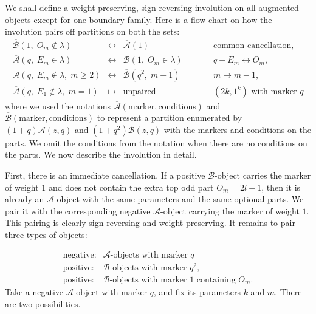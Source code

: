 \documentclass[reqno]{amsart}
\theoremstyle{definition}
\theoremstyle{plain}
\theoremstyle{remark}
\numberwithin{equation}{section}
\begin{document}
We shall define a weight-preserving, sign-reversing involution on all augmented
objects except for one boundary family. Here is a flow-chart on how the involution pairs off partitions on both the sets:
\[
\begin{array}{rclcl}
\overline{\mathcal B}(1,\;O_m\notin\lambda)
&\longleftrightarrow&
\overline{\mathcal A}(1)
&\qquad&
\text{common cancellation},\\[2mm]

\overline{\mathcal A}(q,\;E_m\in\lambda)
&\longleftrightarrow&
\overline{\mathcal B}(1,\;O_m\in\lambda)
&\qquad&
q+E_m\leftrightarrow O_m,\\[2mm]

\overline{\mathcal A}(q,\;E_m\notin\lambda,\;m\ge2)
&\longleftrightarrow&
\overline{\mathcal B}(q^2,\;m-1)
&\qquad&
m\mapsto m-1,\\[2mm]

\overline{\mathcal A}(q,\;E_1\notin\lambda,\;m=1)
&\longmapsto&
\text{unpaired}
&\qquad&
(2k,1^k)\text{ with marker }q
\end{array}
\]
where we used the notations $\overline{\mathcal A}(\text{marker},\text{conditions})$ and $\overline{\mathcal B}(\text{marker},\text{conditions})$ to represent a partition enumerated by $(1+q)\mathcal A(z,q)$ and $(1+q^2)\mathcal B(z,q)$ with the markers and conditions on the parts. We omit the conditions from the notation when there are no conditions on the parts. We now describe the involution in detail. 

First, there is an immediate cancellation.  If a positive \(\mathcal B\)-object carries the marker of weight \(1\) and does not contain the extra top odd part \(O_m=2l-1\), then it is already
an \(\mathcal A\)-object with the same parameters and the same optional parts.  We pair
it with the corresponding negative \(\mathcal A\)-object carrying the marker of weight
\(1\).  This pairing is clearly sign-reversing and weight-preserving. It remains to pair three types of objects:

\[
\begin{array}{ll}
\text{negative:}&\mathcal A\text{-objects with marker }q\\
\text{positive:} & \mathcal B\text{-objects with marker }q^2,\\
\text{positive:} & \mathcal B\text{-objects with marker }1\text{ containing }O_m.
\end{array}
\]
Take a negative \(\mathcal A\)-object with marker \(q\), and fix its parameters \(k\) and \(m\).  There are two possibilities.
\end{document}
